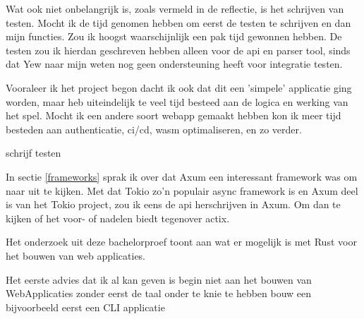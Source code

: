 Wat ook niet onbelangrijk is, zoals vermeld in de reflectie, is het schrijven van testen. Mocht ik
de tijd genomen hebben om eerst de testen te schrijven en dan mijn functies. Zou ik hoogst
waarschijnlijk een pak tijd gewonnen hebben. De testen zou ik hierdan geschreven hebben alleen voor
de api en parser tool, sinds dat Yew naar mijn weten nog geen ondersteuning heeft voor integratie
testen.

Vooraleer ik het project begon dacht ik ook dat dit een 'simpele' applicatie ging worden, maar heb
uiteindelijk te veel tijd besteed aan de logica en werking van het spel. Mocht ik een andere soort
webapp gemaakt hebben kon ik meer tijd besteden aan authenticatie, ci/cd, wasm optimaliseren, en zo
verder.

schrijf testen


In sectie \ref{frameworks} sprak ik over dat Axum een interessant framework was om naar uit te
kijken. Met dat Tokio zo'n populair async framework is en Axum deel is van het Tokio project, zou ik
eens de api herschrijven in Axum. Om dan te kijken of het voor- of nadelen biedt tegenover actix.



Het onderzoek uit deze bachelorproef toont aan wat er mogelijk is met Rust voor het bouwen van web
applicaties.

Het eerste advies dat ik al kan geven is begin niet aan het bouwen van WebApplicaties zonder eerst
de taal onder te knie te hebben
bouw een bijvoorbeeld eerst een CLI applicatie
